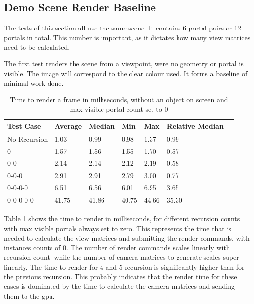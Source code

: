 \subsection{Demo Scene Render Baseline}
The tests of this section all use the same scene. It contains 6 portal pairs or 12 portals in total. This number is important, as it dictates how many view matrices need to be calculated.

The first test renders the scene from a viewpoint, were no geometry or portal is visible. The image will correspond to the clear colour used. It forms a baseline of minimal work done.

\begin{table}[H]
	\centering
	\begin{tabular}{|l|l|l|l|l|l|l|}
		\hline
		Test Case    & Average & Median & Min   & Max   & Relative Median \\ \hline
		No Recursion & 1.03    & 0.99   & 0.98  & 1.37  & 0.99            \\ \hline
		0            & 1.57    & 1.56   & 1.55  & 1.70  & 0.57            \\ \hline
		0-0          & 2.14    & 2.14   & 2.12  & 2.19  & 0.58            \\ \hline
		0-0-0        & 2.91    & 2.91   & 2.79  & 3.00  & 0.77            \\ \hline
		0-0-0-0      & 6.51    & 6.56   & 6.01  & 6.95  & 3.65            \\ \hline
		0-0-0-0-0    & 41.75   & 41.86  & 40.75 & 44.66 & 35.30           \\ \hline        
	\end{tabular}
	\caption{Time to render a frame in milliseconds, without an object on screen and max visible portal count set to 0}
	\label{tab:baseline}
\end{table}

Table \ref{tab:baseline} shows the time to render in milliseconds, for different recursion counts with max visible portals always set to zero. This represents the time that is needed to calculate the view matrices and submitting the render commands, with instances counts of 0. The number of render commands scales linearly with recursion count, while the number of camera matrices to generate scales super linearly. The time to render for 4 and 5 recursion is significantly higher than for the previous recursion. This probably indicates that the render time for these cases is dominated by the time to calculate the camera matrices and sending them to the \gls{gpu}.

